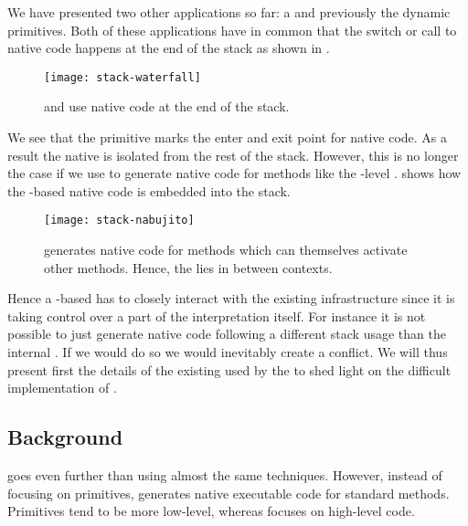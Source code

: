 We have presented two other \B applications so far: a \FFI and previously the dynamic primitives.
Both of these applications have in common that the switch or call to native code happens at the end of the \PH stack as shown in .
%
\begin{figure}[h]
	\centering
	\texttt{[image: stack-waterfall]}
	\caption[\WF Stack Usage]{
	\WF and \NB use native code at the end of the \PH stack.}
\end{figure}
%
We see that the \B primitive marks the enter and exit point for native code.
As a result the native is isolated from the rest of the stack.
However, this is no longer the case if we use \B to generate native code for \PH methods like the \VM-level \JIT.
 shows how the \B-based native code is embedded into the \PH stack.
%
\begin{figure}[h]
	\centering
	\texttt{[image: stack-nabujito]}
	\caption[\NBJ Stack Usage]{
	\NBJ generates native code for \PH methods which can themselves activate other methods.
	Hence, the \B lies in between \PH contexts. }
\end{figure}
%
Hence a \B-based \JIT has to closely interact with the existing infrastructure since it is taking control over a part of the interpretation itself.
For instance it is not possible to just generate native code following a different stack usage than the internal \JIT.
If we would do so we would inevitably create a conflict.
We will thus present first the details of the existing \JIT used by the \PH \VM to shed light on the difficult implementation of \NBJ.



\subsection{Background}

\NBJ goes even further than \WF using almost the same techniques.
However, instead of focusing on primitives, \NBJ generates native executable code for standard \ST methods.
Primitives tend to be more low-level, whereas \NBJ focuses on high-level \ST code. 


